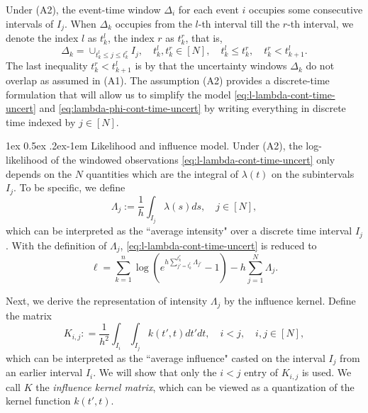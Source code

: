 \documentclass[11pt]{article}
\makeatletter
\theoremstyle{remark}
\theoremstyle{plain}
\renewcommand{\paragraph}{%
  \@startsection{paragraph}{4}%
  {\z@}{1ex \@plus 0.5ex \@minus .2ex}{-1em}%
  {\normalfont\normalsize\itshape}%
}
\makeatother
\begin{document}
Under (A2), the event-time window $\Delta_i$ for each event $i$ occupies some consecutive intervals of $I_j$.
When $\Delta_k$ occupies from 
the $l$-th interval till the $r$-th interval, 
 we denote the index $l$ as $t_k^l$,
 the index $r$ as $t_k^r$, that is,
 \begin{equation}\label{eq:Deltak-discrete-time-multiple-Ij}
 \Delta_k = \cup_{ t_k^l \le j \le t_k^r } I_j,
 \quad t_k^l, t_k^r \in [N], 
 \quad t_k^l \le t_k^r, 
 \quad  t_{k}^r < t_{k+1}^l.
 \end{equation}
The last inequality $t_{k}^r < t_{k+1}^l$ is by that the uncertainty windows $\Delta_k$ do not overlap as assumed in (A1).
%
The assumption (A2) provides a discrete-time formulation
that will  allow us to simplify the model \eqref{eq:l-lambda-cont-time-uncert} and \eqref{eq:lambda-phi-cont-time-uncert} by writing everything in discrete time indexed by $j \in [N]$.  


\paragraph{Likelihood and influence model.}
Under (A2), the log-likelihood of the windowed observations \eqref{eq:l-lambda-cont-time-uncert} only depends on the $N$ quantities which are the integral of $\lambda(t)$ on the subintervals $I_j$. 
 To be specific,  we define
\begin{equation}\label{eq:def-Lambdaj-discrete-time}
\Lambda_j := \frac{1}{ h }  \int_{I_j} \lambda(s) ds, \quad j \in [N],
\end{equation}
which can be interpreted as the ``average intensity" over a discrete time interval $I_j$.
With the definition of $\Lambda_j$, \eqref{eq:l-lambda-cont-time-uncert} is reduced to 
\begin{equation}\label{eq:l-lambda-dis-time-uncert}
\ell 
= \sum_{k=1}^n \log \left( e^{ h \sum_{ j' = {t_k^l}}^{t_k^r}  \Lambda_{j'} }   - 1 \right)
-  h \sum_{j=1}^N  \Lambda_j.
\end{equation}



Next, we derive the representation of intensity $\Lambda_j$ by the influence kernel.
Define the matrix 
\begin{equation}\label{eq:def-Kij-discrete-time}
K_{i,j} : = \frac{1}{ h^2  }\int_{I_{i}} \int_{I_j} k( t', t) dt' dt, \quad i < j, \quad i,j \in [N], 
\end{equation}
which can be interpreted as the ``average influence" casted on the interval $I_j$ from an earlier interval $I_i$.
We will show that only the $i< j$ entry of $K_{i,j}$ is used. We call $K$ the {\it influence kernel matrix}, which can be viewed as a quantization of the kernel function $k(t',t)$.
\end{document}
